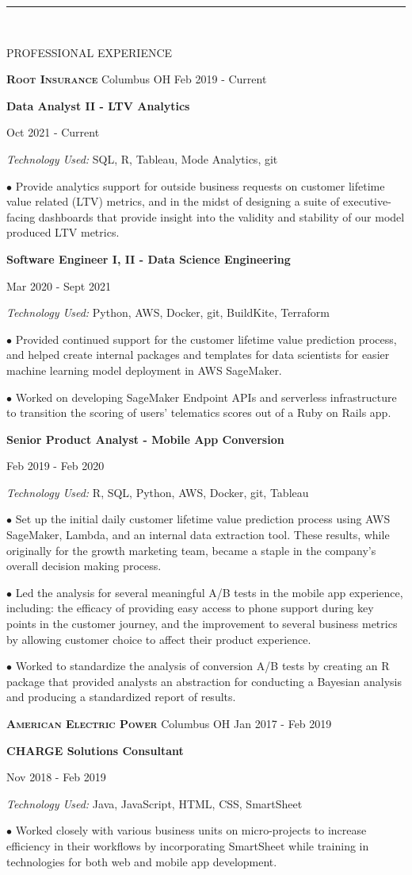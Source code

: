 \documentclass[12pt]{article}
\newcommand{\tab}[1][1cm]{\hspace*{#1}}
\newcommand{\header}[1]{
    \vspace*{-2mm}
    \rule{6.5in}{3pt} \\
    \smallskip
    \begin{large}
	    \textsc{\textcolor{lblue}{#1}}
    \end{large}
    \medskip
}
\newcommand{\company}[4]{
    \textsc{\textbf{#1}} \tab \small {#2} \hfill \small {#3 {-} #4} \\
    \smallskip
}
\newcommand{\position}[4]{
    \tab \textbf{#1} \hfill {\footnotesize #2 {-} #3 \par}
    \tab[1.25cm] \textit{Technology Used:} #4 \\
    \vspace*{0.5mm}
}
\newcommand{\bulletpoint}[1]{
  \hangindent=1.8cm \tab[1.3cm] $\bullet$#1 \\
  \vspace*{0.5mm}
}
\begin{document}
  \begin{flushleft}
    \header{PROFESSIONAL EXPERIENCE}

    \company{Root Insurance}{Columbus OH}{Feb 2019}{Current}

    \position{Data Analyst II - LTV Analytics}{Oct 2021}{Current}{SQL, R, Tableau, Mode Analytics, git}
    \bulletpoint{
    	Provide analytics support for outside business requests on customer
	lifetime value related (LTV) metrics, and in the midst of designing a suite
	of executive-facing dashboards that provide insight into the validity and
	stability of our model produced LTV metrics.
    }
    \medskip

    \position{Software Engineer I, II - Data Science Engineering}{Mar 2020}{Sept 2021}{Python, AWS, Docker, git, BuildKite, Terraform}
    \bulletpoint{
    	Provided continued support for the customer lifetime value prediction process,
	and helped create internal packages and templates for data scientists for easier
	machine learning model deployment in AWS SageMaker.
    }
    \bulletpoint{
    	Worked on developing SageMaker Endpoint APIs and serverless infrastructure
	to transition the scoring of users' telematics scores out of a Ruby on Rails app.
    }
    \medskip

    \position{Senior Product Analyst - Mobile App Conversion}{Feb 2019}{Feb 2020}{R, SQL, Python, AWS, Docker, git, Tableau}
    \bulletpoint{
    	Set up the initial daily customer lifetime value prediction process using AWS SageMaker,
	Lambda, and an internal data extraction tool. These results, while originally for the growth
	marketing team, became a staple in the company's overall decision making process.
    }
    \bulletpoint{
    	Led the analysis for several meaningful A/B tests in the mobile app experience, including:
	the efficacy of providing easy access to phone support during key points in the customer
	journey, and the improvement to several business metrics by allowing customer choice
	to affect their product experience.
    }
    \bulletpoint{
    	Worked to standardize the analysis of conversion A/B tests by creating an R package
	that provided analysts an abstraction for conducting a Bayesian analysis and producing
	a standardized report of results.
    }
    \medskip

    \company{American Electric Power}{Columbus OH}{Jan 2017}{Feb 2019}
    
    \position{CHARGE Solutions Consultant}{Nov 2018}{Feb 2019}{Java, JavaScript, HTML, CSS, SmartSheet}
    \bulletpoint{
    	Worked closely with various business units on micro-projects to increase efficiency
	in their workflows by incorporating SmartSheet while training in technologies for both
	web and mobile app development.
    }
    \medskip


\end{flushleft}
\end{document}
